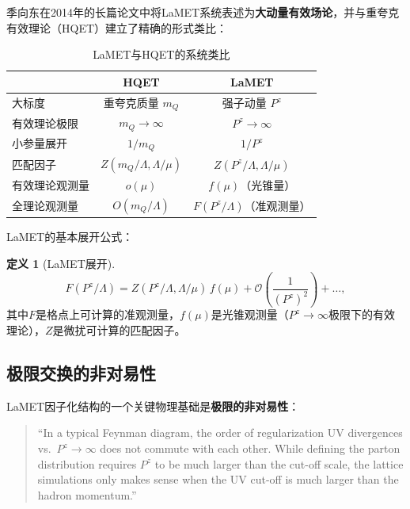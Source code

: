 \documentclass[12pt,a4paper]{ctexart}
\theoremstyle{definition}
\newtheorem{definition}{定义}[section]
\begin{document}
季向东在2014年的长篇论文\cite{Ji2014LaMET}中将LaMET系统表述为\textbf{大动量有效场论}，并与重夸克有效理论（HQET）建立了精确的形式类比：

\begin{table}[H]
\centering
\caption{LaMET与HQET的系统类比\cite{Ji2014LaMET}}
\label{tab:LaMET_vs_HQET}
\begin{tabular}{lcc}
\toprule
& HQET & LaMET \\
\midrule
大标度        & 重夸克质量 $m_Q$ & 强子动量 $P^z$ \\
有效理论极限  & $m_Q \to \infty$ & $P^z \to \infty$ \\
小参量展开    & $1/m_Q$          & $1/P^z$ \\
匹配因子      & $Z(m_Q/\Lambda, \Lambda/\mu)$ & $Z(P^z/\Lambda, \Lambda/\mu)$ \\
有效理论观测量 & $o(\mu)$         & $f(\mu)$（光锥量） \\
全理论观测量   & $O(m_Q/\Lambda)$ & $F(P^z/\Lambda)$（准观测量） \\
\bottomrule
\end{tabular}
\end{table}

LaMET的基本展开公式\cite{Ji2014LaMET}：

\begin{definition}[LaMET展开]
\begin{equation}
\boxed{F(P^z/\Lambda) = Z(P^z/\Lambda, \Lambda/\mu) \, f(\mu) + \mathcal{O}\left(\frac{1}{(P^z)^2}\right) + \ldots},
\label{eq:LaMET_expansion}
\end{equation}
其中$F$是格点上可计算的准观测量，$f(\mu)$是光锥观测量（$P^z \to \infty$极限下的有效理论），$Z$是微扰可计算的匹配因子。
\end{definition}

\subsection{极限交换的非对易性}

LaMET因子化结构的一个关键物理基础是\textbf{极限的非对易性}\cite{Ji2013Euclidean,Ji2014LaMET}：

\begin{quote}
``In a typical Feynman diagram, the order of regularization UV divergences vs.\ $P^z \to \infty$ does not commute with each other. While defining the parton distribution requires $P^z$ to be much larger than the cut-off scale, the lattice simulations only makes sense when the UV cut-off is much larger than the hadron momentum.''
\end{quote}
\end{document}
